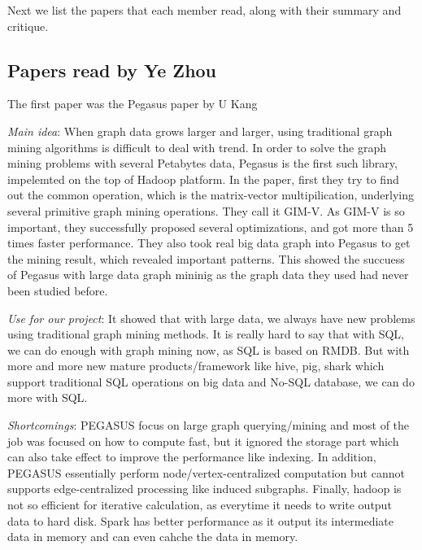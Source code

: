Next we list the papers that each member read,
along with their summary and critique.

\subsection{Papers read by Ye Zhou}
The first paper was the Pegasus paper by U Kang
\begin{itemize*}
\item {\em Main idea}: 
      When graph data grows larger and larger, using traditional graph mining algorithms is difficult to deal with trend. In order to solve the graph 
      mining problems with several Petabytes data, Pegasus is the first such library, impelemted on the top of Hadoop platform. In the paper, first they 
      try to find out the common operation, which is the matrix-vector multipilication, underlying several primitive graph mining operations. They call it 
      GIM-V. As GIM-V is so important, they successfully proposed several optimizations, and got more than 5 times faster performance. They also took real 
      big data graph into Pegasus to get the mining result, which revealed important patterns. This showed the succuess of Pegasus with large data graph 
      mininig as the graph data they used had never been studied before.
\item {\em Use for our project}:
      It showed that with large data, we always have new problems using traditional graph mining methods. It is really hard to say that with SQL, we can 
      do enough with graph mining now, as SQL is based on RMDB. But with more and more new mature products/framework like hive, pig, shark which support 
      traditional SQL operations on big data and No-SQL database, we can do more with SQL. 
\item {\em Shortcomings}:
      PEGASUS focus on large graph querying/mining and most of the job was focused on how to compute fast, but it ignored the storage part which can also 
      take effect to improve the performance like indexing. In addition, PEGASUS essentially perform node/vertex-centralized computation but cannot 
      supports edge-centralized processing like induced subgraphs. Finally, hadoop is not so efficient for iterative calculation, as everytime it needs to 
      write output data to hard disk. Spark has better performance as it output its intermediate data in memory and can even cahche the data in memory.
\end{itemize*}

